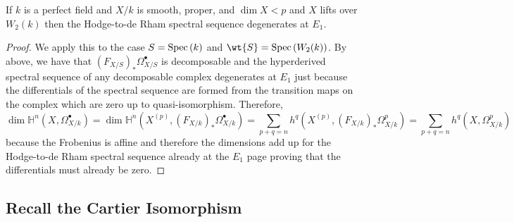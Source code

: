 \documentclass[12pt]{article}
\begin{document}
\begin{cor}
If $k$ is a perfect field and $X/k$ is smooth, proper, and $\dim{X} < p$ and $X$ lifts over $W_2(k)$ then the Hodge-to-de Rham spectral sequence degenerates at $E_1$. 
\end{cor}

\begin{proof}
We apply this to the case $S = \mathrm{Spec}\left( k \right)$ and $\wt{S} = \Spec{W_2(k)}$. By above, we have that $(F_{X/S})_* \Omega^\bullet_{X/S}$ is decomposable and the hyperderived spectral sequence of any decomposable complex degenerates at $E_1$ just because the differentials of the spectral sequence are formed from the transition maps on the complex which are zero up to quasi-isomorphism. Therefore,
\[ \dim \mathbb{H}^n(X, \Omega_{X/k}^\bullet) = \dim \mathbb{H}^n(X^{(p)}, (F_{X/k})_* \Omega_{X/k}^\bullet) = \sum_{p + q = n} h^q(X^{(p)}, (F_{X/k})_* \Omega^p_{X/k}) = \sum_{p + q = n} h^q(X, \Omega^p_{X/k}) \]
because the Frobenius is affine and therefore the dimensions add up for the Hodge-to-de Rham spectral sequence already at the $E_1$ page proving that the differentials must already be zero.
\end{proof}

\subsection{Recall the Cartier Isomorphism}
\end{document}
